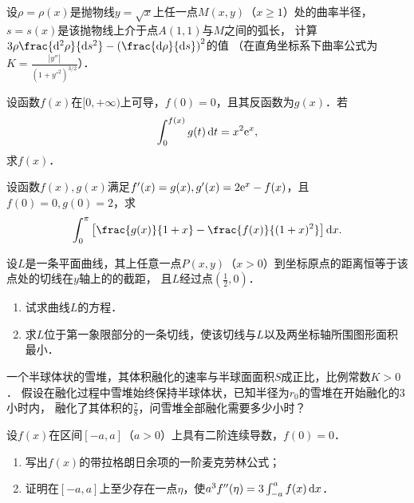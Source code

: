 \documentclass[plain,noanswer,medmath]{../../template/jnuexam}
\begin{document}

\begin{problem}
设$\rho = \rho(x)$是抛物线$y = \sqrt{x}$上任一点$M(x,y)$（$x \ge 1$）处的曲率半径，
$s = s(x)$是该抛物线上介于点$A(1,1)$与$M$之间的弧长，
计算$3\rho \frac{\d^2\rho}{\ds^2} - \left(\frac{\d\rho}{\ds} \right)^2$的值%
（在直角坐标系下曲率公式为$K = \frac{\left| y'' \right|}{(1 + y'^2)^{3/2}}$）．
\end{problem}



\begin{problem}
设函数$f(x)$在$[0, +\infty)$上可导，$f(0) = 0$，且其反函数为$g(x)$．若
$$\int_0^{f(x)} g(t)\mathop{}\!\mathrm{d} t = x^2\mathrm{e}^x,$$
求$f(x)$．
\end{problem}



\begin{problem}
设函数$f(x),g(x)$满足$f'(x) = g(x),g'(x) = 2\mathrm{e}^x - f(x)$，且$f(0) = 0,g(0) = 2$，求
$$\int_0^{\pi}\left[\frac{g(x)}{1 + x} - \frac{f(x)}{(1 + x)^2} \right] \dx.$$
\end{problem}



\begin{problem}
设$L$是一条平面曲线，其上任意一点$P(x,y)$（$x > 0$）到坐标原点的距离恒等于该点处的切线在$y$轴上的的截距，
且$L$经过点$\left(\frac{1}{2},0 \right)$．
\begin{enumerate}
\item 试求曲线$L$的方程．
\item 求$L$位于第一象限部分的一条切线，使该切线与$L$以及两坐标轴所围图形面积最小．
\end{enumerate}
\end{problem}



\begin{problem}
一个半球体状的雪堆，其体积融化的速率与半球面面积$S$成正比，比例常数$K > 0$．
假设在融化过程中雪堆始终保持半球体状，已知半径为$r_0$的雪堆在开始融化的$3$小时内，
融化了其体积的$\frac{7}{8}$，问雪堆全部融化需要多少小时？
\end{problem}



\begin{problem}
设$f(x)$在区间$[- a,a]$（$a > 0$）上具有二阶连续导数，$f(0) = 0$．
\begin{enumerate}
\item 写出$f(x)$的带拉格朗日余项的一阶麦克劳林公式；
\item 证明在$[- a,a]$上至少存在一点$\eta$，使$a^3 f''(\eta) = 3\int_{- a}^a f(x)\mathop{}\!\mathrm{d} x$．
\end{enumerate}
\end{problem}
\end{document}
